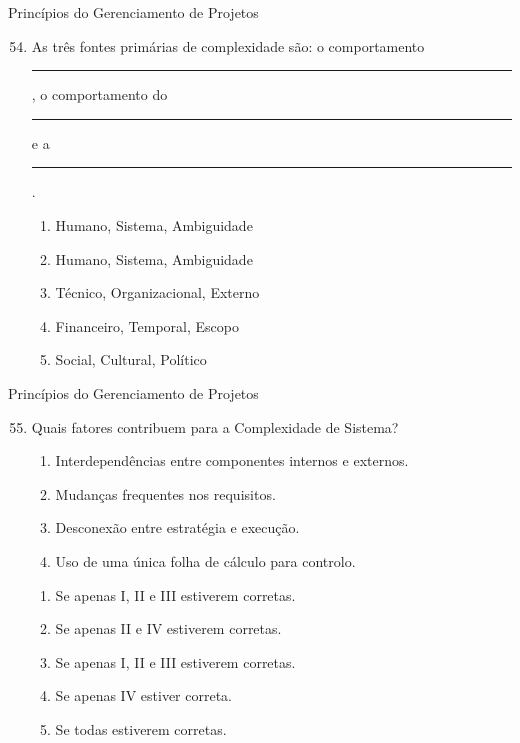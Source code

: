\documentclass{beamer}
\begin{document}
\begin{frame}{Princípios do Gerenciamento de Projetos}
	\begin{enumerate}
		\setcounter{enumi}{53}
		\justifying
		\item As três fontes primárias de complexidade são: o comportamento \rule{50pt}{1pt}, o comportamento do \rule{50pt}{1pt} e a \rule{50pt}{1pt}.
		\begin{enumerate}[a]
			\item Humano, Sistema, Ambiguidade
			\item \alert<2>{Humano, Sistema, Ambiguidade}
			\item Técnico, Organizacional, Externo
			\item Financeiro, Temporal, Escopo
			\item Social, Cultural, Político
		\end{enumerate}
	\end{enumerate}
\end{frame}

\begin{frame}{Princípios do Gerenciamento de Projetos}
	\begin{enumerate}
		\setcounter{enumi}{54}
		\justifying
		\item Quais fatores contribuem para a Complexidade de Sistema?
		\begin{enumerate}[I]
			\item Interdependências entre componentes internos e externos.
			\item Mudanças frequentes nos requisitos.
			\item Desconexão entre estratégia e execução.
			\item Uso de uma única folha de cálculo para controlo.
		\end{enumerate}
		\begin{enumerate}[a]
			\item Se apenas I, II e III estiverem corretas.
			\item Se apenas II e IV estiverem corretas.
			\item \alert<2>{Se apenas I, II e III estiverem corretas.}
			\item Se apenas IV estiver correta.
			\item Se todas estiverem corretas.
		\end{enumerate}
	\end{enumerate}
\end{frame}
\end{document}
